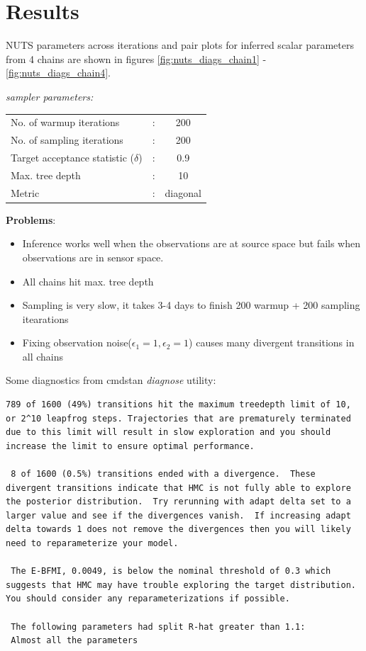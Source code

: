 \documentclass[12pt]{article}
\begin{document}
 \section*{Results}
 NUTS parameters across iterations and pair plots for inferred scalar parameters from 4 chains are shown in figures \ref{fig:nuts_diags_chain1} - \ref{fig:nuts_diags_chain4}.

 \textit{sampler parameters:}
 
 \begin{tabular}{lcc}
   No. of warmup iterations & : & 200 \\
   No. of sampling iterations & : & 200 \\
   Target acceptance statistic ($\delta$) & : & 0.9 \\
   Max. tree depth & : & 10 \\
   Metric & : & diagonal \\
 \end{tabular}

 \clearpage
 \textbf{Problems}: 
 \begin{itemize}
 \item Inference works well when the observations are at source space but fails when observations are in sensor space. 
 \item All chains hit max. tree depth
 \item Sampling is very slow, it takes 3-4 days to finish 200 warmup + 200 sampling itearations
 \item Fixing observation noise($\epsilon_1=1, \epsilon_2=1$) causes many divergent transitions in all chains
 \end{itemize}
 

Some diagnostics from cmdstan \textit{diagnose} utility:

\begin{lstlisting}[breaklines]
 789 of 1600 (49%) transitions hit the maximum treedepth limit of 10, or 2^10 leapfrog steps. Trajectories that are prematurely terminated due to this limit will result in slow exploration and you should increase the limit to ensure optimal performance.

 8 of 1600 (0.5%) transitions ended with a divergence.  These divergent transitions indicate that HMC is not fully able to explore the posterior distribution.  Try rerunning with adapt delta set to a larger value and see if the divergences vanish.  If increasing adapt delta towards 1 does not remove the divergences then you will likely need to reparameterize your model.

 The E-BFMI, 0.0049, is below the nominal threshold of 0.3 which suggests that HMC may have trouble exploring the target distribution.  You should consider any reparameterizations if possible.

 The following parameters had split R-hat greater than 1.1:
 Almost all the parameters
\end{lstlisting}
 
\end{document}
